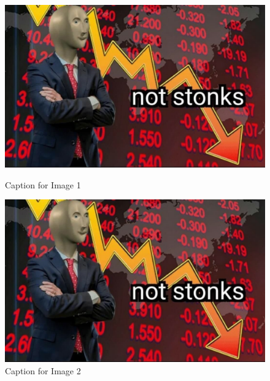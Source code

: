 \documentclass{article}
\begin{document}
\begin{figure}[h!] %

    \begin{minipage}[t]{0.48\textwidth} %
        \centering %
        \includegraphics[width=\textwidth]{diagram-latex.jpeg} 
        \caption{Caption for Image 1}
    \end{minipage}
    \hfill
    \begin{minipage}[t]{0.48\textwidth} %
        \centering %
        \includegraphics[width=\textwidth]{diagram-latex.jpeg} %
        \caption{Caption for Image 2} %
    \end{minipage}

\end{figure}
\end{document}
